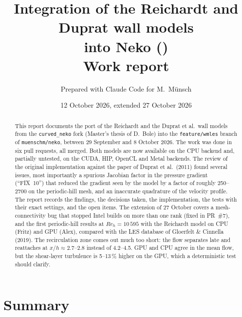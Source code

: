\documentclass[11pt,a4paper]{article}
\title{Integration of the Reichardt and Duprat wall models\\into Neko (\code{feature/wmles})\\[0.5ex]
\large Work report}
\author{Prepared with Claude Code for M.~Münsch}
\date{12 October 2026, extended 27 October 2026}
\newcommand{\code}[1]{\texttt{#1}}
\begin{document}
\maketitle

\begin{abstract}
This report documents the port of the Reichardt and the Duprat et al.\ wall
models from the \code{curved\_neko} fork (Master's thesis of D.~Bole) into
the \code{feature/wmles} branch of \code{muenschm/neko}, between 29 September
and 8 October 2026. The work was done in six pull requests, all merged.
Both models are now available on the CPU backend and, partially untested, on
the CUDA, HIP, OpenCL and Metal backends. The review of the original
implementation against the paper of Duprat et al.\ (2011) found several
issues, most importantly a spurious Jacobian factor in the pressure gradient
(``FIX~10'') that reduced the gradient seen by the model by a factor of
roughly 250--2700 on the periodic-hill mesh, and an inaccurate quadrature of
the velocity profile. The report records the findings, the decisions taken,
the implementation, the tests with their exact settings, and the open
items. The extension of 27 October covers a mesh-connectivity bug that
stopped Intel builds on more than one rank (fixed in PR~\#7), and the first
periodic-hill results at $Re_h = 10\,595$ with the Reichardt model on CPU
(Fritz) and GPU (Alex), compared with the LES database of Gloerfelt \&
Cinnella (2019). The recirculation zone comes out much too short: the flow
separates late and reattaches at $x/h \approx 2.7$--2.8 instead of
4.2--4.5. GPU and CPU agree in the mean flow, but the shear-layer
turbulence is 5--13\,\% higher on the GPU, which a deterministic test should
clarify.
\end{abstract}

\tableofcontents
\newpage

\section{Summary}
\end{document}

